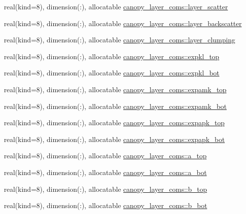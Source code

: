 \begin{DoxyCompactItemize}
\item 
real(kind=8), dimension(\+:), allocatable \hyperlink{namespacecanopy__layer__coms_a3c53cd13498b9f68d6bc94d7810845d3}{canopy\+\_\+layer\+\_\+coms\+::layer\+\_\+scatter}
\item 
real(kind=8), dimension(\+:), allocatable \hyperlink{namespacecanopy__layer__coms_a12455d67a7344d67667413f7a371ba7a}{canopy\+\_\+layer\+\_\+coms\+::layer\+\_\+backscatter}
\item 
real(kind=8), dimension(\+:), allocatable \hyperlink{namespacecanopy__layer__coms_a3bb08434b8bb97d6c0b52e6b39189730}{canopy\+\_\+layer\+\_\+coms\+::layer\+\_\+clumping}
\item 
real(kind=8), dimension(\+:), allocatable \hyperlink{namespacecanopy__layer__coms_a1759562df86795105d565baca407e299}{canopy\+\_\+layer\+\_\+coms\+::expkl\+\_\+top}
\item 
real(kind=8), dimension(\+:), allocatable \hyperlink{namespacecanopy__layer__coms_a97beb2506887f723e41a70d5f75b6a91}{canopy\+\_\+layer\+\_\+coms\+::expkl\+\_\+bot}
\item 
real(kind=8), dimension(\+:), allocatable \hyperlink{namespacecanopy__layer__coms_abb449a0f8ffd39c8d2e8f880f6e430ab}{canopy\+\_\+layer\+\_\+coms\+::expamk\+\_\+top}
\item 
real(kind=8), dimension(\+:), allocatable \hyperlink{namespacecanopy__layer__coms_a97f0e913b53dc4ee87bae6d9efe52192}{canopy\+\_\+layer\+\_\+coms\+::expamk\+\_\+bot}
\item 
real(kind=8), dimension(\+:), allocatable \hyperlink{namespacecanopy__layer__coms_afe005bb965214174ac674496f52449f8}{canopy\+\_\+layer\+\_\+coms\+::expapk\+\_\+top}
\item 
real(kind=8), dimension(\+:), allocatable \hyperlink{namespacecanopy__layer__coms_ab65f7a83a69f569d877187dabb799a7d}{canopy\+\_\+layer\+\_\+coms\+::expapk\+\_\+bot}
\item 
real(kind=8), dimension(\+:), allocatable \hyperlink{namespacecanopy__layer__coms_acef66a2794edd028cbebb25b81c94582}{canopy\+\_\+layer\+\_\+coms\+::a\+\_\+top}
\item 
real(kind=8), dimension(\+:), allocatable \hyperlink{namespacecanopy__layer__coms_a363ffecb6cfbea0e04ccff6048870913}{canopy\+\_\+layer\+\_\+coms\+::a\+\_\+bot}
\item 
real(kind=8), dimension(\+:), allocatable \hyperlink{namespacecanopy__layer__coms_af986529a5d36d7c69ccaf9af08e38d1c}{canopy\+\_\+layer\+\_\+coms\+::b\+\_\+top}
\item 
real(kind=8), dimension(\+:), allocatable \hyperlink{namespacecanopy__layer__coms_a6d1bef43490e88277ca78abdc845766c}{canopy\+\_\+layer\+\_\+coms\+::b\+\_\+bot}

\end{DoxyCompactItemize}

